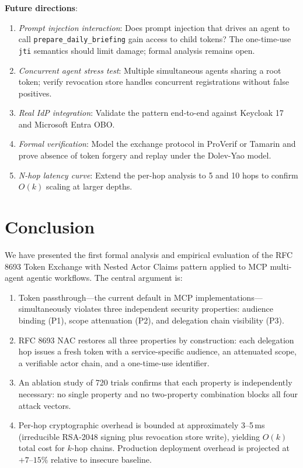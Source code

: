 \documentclass[journal]{IEEEtran}
\begin{document}
\textbf{Future directions}:
\begin{enumerate}
  \item \textit{Prompt injection interaction}: Does prompt injection that drives
        an agent to call \texttt{prepare\_daily\_briefing} gain access to child
        tokens? The one-time-use \texttt{jti} semantics should limit damage;
        formal analysis remains open.
  \item \textit{Concurrent agent stress test}: Multiple simultaneous agents
        sharing a root token; verify revocation store handles concurrent
        registrations without false positives.
  \item \textit{Real IdP integration}: Validate the pattern end-to-end against
        Keycloak 17 and Microsoft Entra OBO.
  \item \textit{Formal verification}: Model the exchange protocol in ProVerif
        \cite{blanchet2001} or Tamarin \cite{meier2013} and prove absence of
        token forgery and replay under the Dolev-Yao model.
  \item \textit{N-hop latency curve}: Extend the per-hop analysis to 5 and 10
        hops to confirm $O(k)$ scaling at larger depths.
\end{enumerate}


\section{Conclusion}
\label{sec:conclusion}

We have presented the first formal analysis and empirical evaluation of the
RFC 8693 Token Exchange with Nested Actor Claims pattern applied to MCP
multi-agent agentic workflows. The central argument is:

\begin{enumerate}
  \item Token passthrough---the current default in MCP implementations---
        simultaneously violates three independent security properties:
        audience binding (P1), scope attenuation (P2), and delegation chain
        visibility (P3).
  \item RFC 8693 NAC restores all three properties by construction: each
        delegation hop issues a fresh token with a service-specific audience,
        an attenuated scope, a verifiable actor chain, and a one-time-use
        identifier.
  \item An ablation study of 720 trials confirms that each property is
        independently necessary: no single property and no two-property
        combination blocks all four attack vectors.
  \item Per-hop cryptographic overhead is bounded at approximately 3--5\,ms
        (irreducible RSA-2048 signing plus revocation store write), yielding
        $O(k)$ total cost for $k$-hop chains. Production deployment overhead
        is projected at $+7$--$15\%$ relative to insecure baseline.
\end{enumerate}
\end{document}
